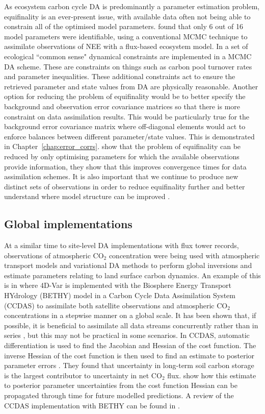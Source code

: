 As ecosystem carbon cycle DA is predominantly a parameter estimation problem, equifinality is an ever-present issue, with available data often not being able to constrain all of the optimised model parameters. \citet{Wu01012009} found that only 6 out of 16 model parameters were identifiable, using a conventional MCMC technique to assimilate observations of NEE with a flux-based ecosystem model. In \citet{Bloom2015} a set of ecological ``common sense" dynamical constraints are implemented in a MCMC DA scheme. These are constraints on things such as carbon pool turnover rates and parameter inequalities. These additional constraints act to ensure the retrieved parameter and state values from DA are physically reasonable. Another option for reducing the problem of equifinality would be to better specify the background and observation error covariance matrices so that there is more constraint on data assimilation results. This would be particularly true for the background error covariance matrix where off-diagonal elements would act to enforce balances between different parameter/state values. This is demonstrated in Chapter~\ref{chap:error_corrs}. \citet{ziehn2011} show that the problem of equifinality can be reduced by only optimising parameters for which the available observations provide information, they show that this improves convergence times for data assimilation schemes. It is also important that we continue to produce new distinct sets of observations in order to reduce equifinality further and better understand where model structure can be improved \citep{Carvalhais2010}.


\subsection{Global implementations}

At a similar time to site-level DA implementations with flux tower records, observations of atmospheric CO\(_{2}\) concentration were being used with atmospheric transport models and variational DA methods to perform global inversions and estimate parameters relating to land surface carbon dynamics. An example of this is in \citet{rayner2005two} where 4D-Var is implemented with the Biosphere Energy Transport HYdrology (BETHY) model \citep{knorr2001uncertainties} in a Carbon Cycle Data Assimilation System (CCDAS) to assimilate both satellite observations and atmospheric CO\(_{2}\) concentrations in a stepwise manner on a global scale. It has been shown that, if possible, it is beneficial to assimilate all data streams concurrently rather than in series \citep{macbean2016consistent}, but this may not be practical in some scenarios. In CCDAS, automatic differentiation is used to find the Jacobian and Hessian of the cost function. The inverse Hessian of the cost function is then used to find an estimate to posterior parameter errors \citep{rayner2005two}. They found that uncertainty in long-term soil carbon storage is the largest contributor to uncertainty in net CO\(_{2}\) flux. \citet{scholze2007propagating} show how this estimate to posterior parameter uncertainties from the cost function Hessian can be propagated through time for future modelled predictions. A review of the CCDAS implementation with BETHY can be found in \citet{Kaminski2013}. 

